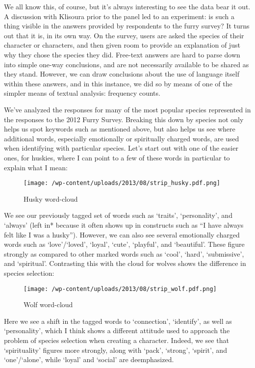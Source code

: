 We all know this, of course, but it's always interesting to see the data
bear it out. A discussion with Klisoura prior to the panel led to an
experiment: is such a thing visible in the answers provided by
respondents to the furry survey? It turns out that it is, in its own
way. On the survey, users are asked the species of their character or
characters, and then given room to provide an explanation of just why
they chose the species they did. Free-text answers are hard to parse
down into simple one-way conclusions, and are not necessarily available
to be shared as they stand. However, we can draw conclusions about the
use of language itself within these answers, and in this instance, we
did so by means of one of the simpler means of textual analysis:
frequency counts.

We've analyzed the responses for many of the most popular species
represented in the responses to the 2012 Furry Survey. Breaking this
down by species not only helps us spot keywords such as mentioned above,
but also helps us see where additional words, especially emotionally or
spiritually charged words, are used when identifying with particular
species. Let's start out with one of the easier ones, for huskies, where
I can point to a few of these words in particular to explain what I
mean:

\begin{figure}[htbp]
\centering
\texttt{[image: /wp-content/uploads/2013/08/strip\_husky.pdf.png]}
\caption{Husky word-cloud}
\end{figure}

We see our previously tagged set of words such as `traits',
`personality', and `always' (left in* because it often shows up in
constructs such as ``I have always felt like I was a husky''). However,
we can also see several emotionally charged words such as
`love'/`loved', `loyal', `cute', `playful', and `beautiful'. These
figure strongly as compared to other marked words such as `cool',
`hard', `submissive', and `spiritual'. Contrasting this with the cloud
for wolves shows the difference in species selection:

\begin{figure}[htbp]
\centering
\texttt{[image: /wp-content/uploads/2013/08/strip\_wolf.pdf.png]}
\caption{Wolf word-cloud}
\end{figure}

Here we see a shift in the tagged words to `connection', `identify', as
well as `personality', which I think shows a different attitude used to
approach the problem of species selection when creating a character.
Indeed, we see that `spirituality' figures more strongly, along with
`pack', `strong', `spirit', and `one'/`alone', while `loyal' and
`social' are deemphasized.

